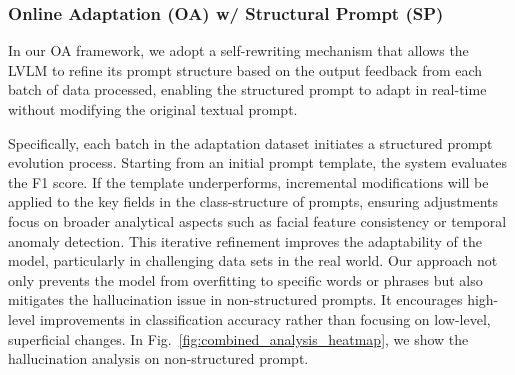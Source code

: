 

\subsubsection{Online Adaptation (OA) w/ Structural Prompt (SP)}
In our OA framework, we adopt a self-rewriting mechanism that allows the LVLM to refine its prompt structure based on the output feedback from each batch of data processed, enabling the structured prompt to adapt in real-time without modifying the original textual prompt.

Specifically, each batch in the adaptation dataset initiates a structured prompt evolution process. Starting from an initial prompt template, the system evaluates the F1 score. If the template underperforms, incremental modifications will be applied to the key fields in the class-structure of prompts, ensuring adjustments focus on broader analytical aspects such as facial feature consistency or temporal anomaly detection. 
This iterative refinement improves the adaptability of the model, particularly in challenging data sets in the real world.
Our approach not only prevents the model from overfitting to specific words or phrases but also mitigates the hallucination issue in non-structured prompts. 
It encourages high-level improvements in classification accuracy rather than focusing on low-level, superficial changes. In Fig.~\ref{fig:combined_analysis_heatmap}, we show the hallucination analysis on non-structured prompt.

